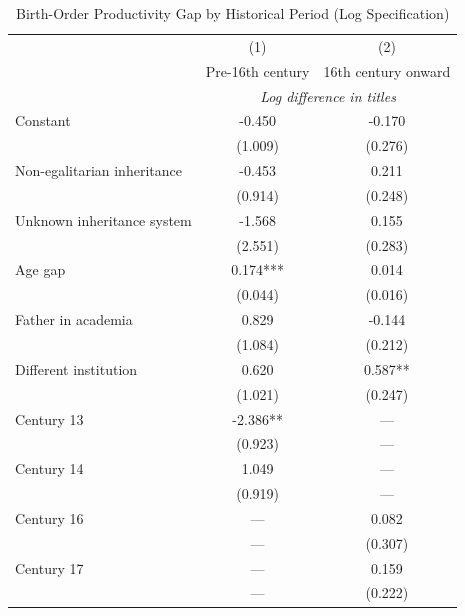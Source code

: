
\begin{table}[H]
\centering
\caption{Birth-Order Productivity Gap by Historical Period (Log Specification)}
\label{tab:period_log_appendix}

\begin{tablebody}
\begin{tabular}{l c c}
\toprule
& (1) & (2) \\
& Pre-16th century & 16th century onward \\
& \multicolumn{2}{c}{\textit{Log difference in titles}} \\
\midrule

Constant
& -0.450
& -0.170 \\
& (1.009)
& (0.276) \\

Non-egalitarian inheritance
& -0.453
& 0.211 \\
& (0.914)
& (0.248) \\

Unknown inheritance system
& -1.568
& 0.155 \\
& (2.551)
& (0.283) \\

Age gap
& 0.174***
& 0.014 \\
& (0.044)
& (0.016) \\

Father in academia
& 0.829
& -0.144 \\
& (1.084)
& (0.212) \\

Different institution
& 0.620
& 0.587** \\
& (1.021)
& (0.247) \\

Century 13
& -2.386** 
& --- \\
& (0.923)
& --- \\

Century 14
& 1.049
& --- \\
& (0.919)
& --- \\

Century 16
& ---
& 0.082 \\
& ---
& (0.307) \\

Century 17
& ---
& 0.159 \\
& ---
& (0.222) \\


\end{tabular}
\end{tablebody}
\end{table}
